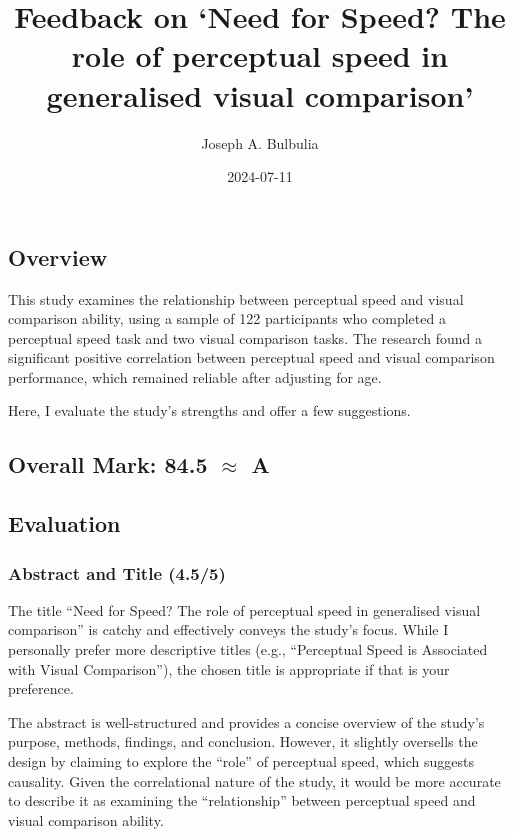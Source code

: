 \documentclass[
  single column]{article}
\title{Feedback on `Need for Speed? The role of perceptual speed in
generalised visual comparison'}
\author{Joseph A. Bulbulia}
\affil{%
             \small{     Victoria University of Wellington, New Zealand
          ORCID \textcolor[HTML]{A6CE39}{\aiOrcid} ~0000-0002-5861-2056 }
              }
\date{2024-07-11}
\begin{document}
\maketitle

\subsection{Overview}\label{overview}

This study examines the relationship between perceptual speed and visual
comparison ability, using a sample of 122 participants who completed a
perceptual speed task and two visual comparison tasks. The research
found a significant positive correlation between perceptual speed and
visual comparison performance, which remained reliable after adjusting
for age.

Here, I evaluate the study's strengths and offer a few suggestions.

\subsection{\texorpdfstring{Overall Mark: 84.5 \(\approx\)
A}{Overall Mark: 84.5 \textbackslash approx A}}\label{overall-mark-84.5-approx-a}

\subsection{Evaluation}\label{evaluation}

\subsubsection{Abstract and Title
(4.5/5)}\label{abstract-and-title-4.55}

The title ``Need for Speed? The role of perceptual speed in generalised
visual comparison'' is catchy and effectively conveys the study's focus.
While I personally prefer more descriptive titles (e.g., ``Perceptual
Speed is Associated with Visual Comparison''), the chosen title is
appropriate if that is your preference.

The abstract is well-structured and provides a concise overview of the
study's purpose, methods, findings, and conclusion. However, it slightly
oversells the design by claiming to explore the ``role'' of perceptual
speed, which suggests causality. Given the correlational nature of the
study, it would be more accurate to describe it as examining the
``relationship'' between perceptual speed and visual comparison ability.
\end{document}
